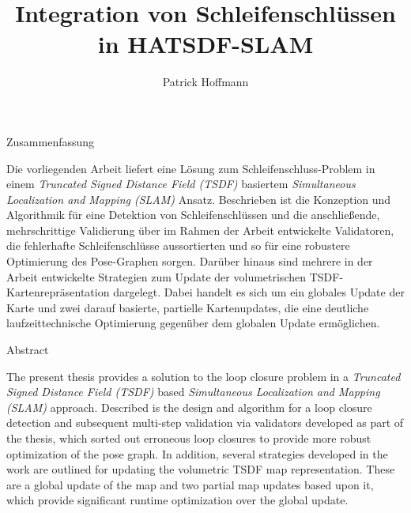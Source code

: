 \documentclass[german, master, utf8, pdftex, dvipsnames]{base/thesis_KBS}
\begin{document}
\title{Integration von Schleifenschlüssen in HATSDF-SLAM} %

\author{Patrick Hoffmann}

\generatetitle

\cleardoublepage

\begin{prefacesection}{Zusammenfassung}

Die vorliegenden Arbeit liefert eine Lösung zum Schleifenschluss-Problem in einem \emph{Truncated Signed Distance Field (TSDF)} basiertem \emph{Simultaneous Localization and Mapping (SLAM)} Ansatz. Beschrieben ist die Konzeption und Algorithmik für eine Detektion von Schleifenschlüssen und die anschließende, mehrschrittige Validierung über im Rahmen der Arbeit entwickelte Validatoren, die fehlerhafte Schleifenschlüsse aussortierten und so für eine robustere Optimierung des Pose-Graphen sorgen. Darüber hinaus sind mehrere in der Arbeit entwickelte Strategien zum Update der volumetrischen TSDF-Kartenrepräsentation dargelegt. Dabei handelt es sich um ein globales Update der Karte und zwei darauf basierte, partielle Kartenupdates, die eine deutliche laufzeittechnische Optimierung gegenüber dem globalen Update ermöglichen.

\end{prefacesection}

\vspace{5cm}

\begin{prefacesection}{Abstract}

The present thesis provides a solution to the loop closure problem in a \emph{Truncated Signed Distance Field (TSDF)} based \emph{Simultaneous Localization and Mapping (SLAM)} approach. Described is the design and algorithm for a loop closure detection and subsequent multi-step validation via validators developed as part of the thesis, which sorted out erroneous loop closures to provide more robust optimization of the pose graph. In addition, several strategies developed in the work are outlined for updating the volumetric TSDF map representation. These are a global update of the map and two partial map updates based upon it, which provide significant runtime optimization over the global update.

\end{prefacesection}
\end{document}
